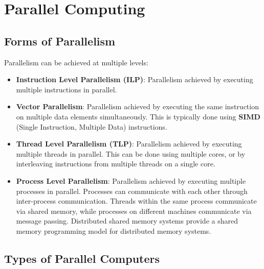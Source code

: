 \documentclass{article}
\begin{document}
\section{Parallel Computing}
\subsection{Forms of Parallelism}
Parallelism can be achieved at multiple levels:
\begin{itemize}
    \item \textbf{Instruction Level Parallelism (ILP)}: Parallelism
          achieved by executing multiple instructions in parallel.
    \item \textbf{Vector Parallelism}: Parallelism achieved by
          executing the same instruction on multiple data elements
          simultaneously. This is typically done using \textbf{SIMD}
          (Single Instruction, Multiple Data) instructions.
    \item \textbf{Thread Level Parallelism (TLP)}: Parallelism achieved
          by executing multiple threads in parallel. This can be done
          using multiple cores, or by interleaving instructions from
          multiple threads on a single core.
    \item \textbf{Process Level Parallelism}: Parallelism achieved
          by executing multiple processes in parallel. Processes can
          communicate with each other through inter-process
          communication. Threads within the same process communicate via
          shared memory, while processes on different machines
          communicate via message passing. Distributed shared memory
          systems provide a shared memory programming model for
          distributed memory systems.
\end{itemize}
\subsection{Types of Parallel Computers}
\end{document}
